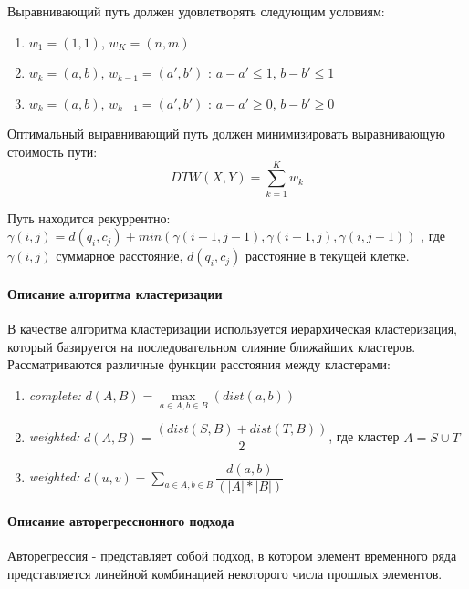 \documentclass[12pt,twoside]{article}
\begin{document}
            Выравнивающий путь должен удовлетворять следующим условиям:
            \begin{enumerate}
                \item $w_1=(1,1)$, $w_K=(n, m)$
                \item $w_k = (a, b)$, $w_{k-1}=(a', b')$ : $a-a' \leq 1$, $b-b' \leq 1$ 
                \item $w_k = (a, b)$, $w_{k-1}=(a', b')$ : $a-a' \geq 0$, $b-b'\geq 0$
            \end{enumerate}

            Оптимальный выравнивающий путь должен минимизировать выравнивающую стоимость пути:
            $$
                DTW(X, Y)=\displaystyle\sum\limits_{k=1}^{K} w_k
            $$
            
            Путь находится рекуррентно:\\
            $\gamma(i, j) = d(q_i, c_j) + min({\gamma(i-1, j-1), \gamma(i-1, j), \gamma(i, j-1)})$ ,
            где $\gamma(i, j)$ суммарное расстояние, $d(q_i, c_j)$ расстояние в текущей клетке.
                
        \paragraph{Описание алгоритма кластеризации}      
            В качестве алгоритма кластеризации используется иерархическая кластеризация, который базируется на последовательном слияние ближайших кластеров.
            Рассматриваются различные функции расстояния между кластерами: 
            \begin{enumerate}
                \item \textit{complete:}  $d(A, B) = \max\limits_{a \in A, b \in B}(dist(a, b))$ 
                \item \textit{weighted:}  $d(A,B) = \dfrac{(dist(S,B) + dist(T,B))}{2}$, где кластер $A = S \cup T$
                \item \textit{weighted:}  $d(u,v) = \sum\limits_{a \in A, b \in B} \dfrac{d(a, b)}{(|A|*|B|)}$ 
            \end{enumerate} 

        \paragraph{Описание авторегрессионного подхода}
            Авторегрессия - представляет собой подход, в котором элемент временного ряда представляется линейной комбинацией некоторого числа прошлых элементов.
\end{document}
